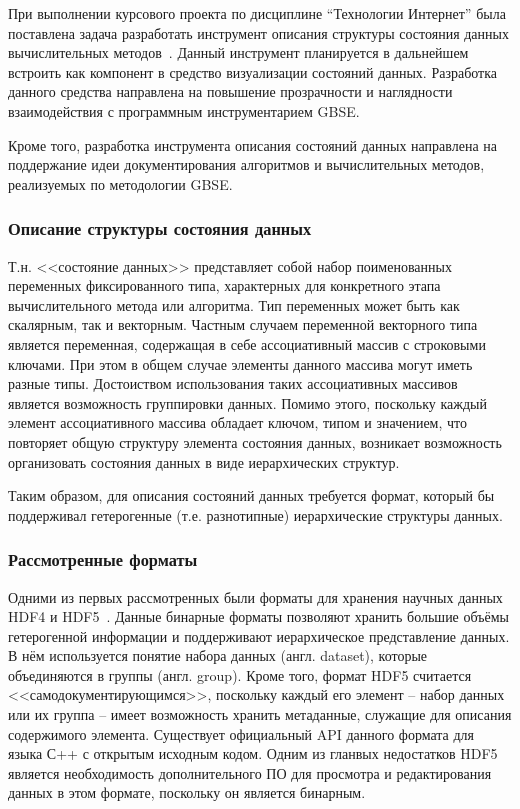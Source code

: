 \def\notedate{2022.05.17}
\def\currentauthor{Тришин И.В.}

При выполнении курсового проекта по дисциплине ``Технологии Интернет'' была поставлена задача разработать инструмент описания структуры состояния данных вычислительных методов~\cite{SokolovPershin2018}. Данный инструмент планируется в дальнейшем встроить как компонент в средство визуализации состояний данных. Разработка данного средства направлена на повышение прозрачности и наглядности взаимодействия с программным инструментарием GBSE.

Кроме того, разработка инструмента описания состояний данных направлена на поддержание идеи документирования алгоритмов и вычислительных методов, реализуемых по методологии GBSE.

\subsubsection{Описание структуры состояния данных}

Т.н. <<состояние данных>> представляет собой набор поименованных переменных фиксированного типа, характерных для конкретного этапа вычислительного метода или алгоритма. Тип переменных может быть как скалярным, так и векторным. Частным случаем переменной векторного типа является переменная, содержащая в себе ассоциативный массив с строковыми ключами. При этом в общем случае элементы данного массива могут иметь разные типы. Достоиством использования таких ассоциативных массивов является возможность группировки данных. Помимо этого, поскольку каждый элемент ассоциативного массива обладает ключом, типом и значением, что повторяет общую структуру элемента состояния данных, возникает возможность организовать состояния данных в виде иерархических структур.

Таким образом, для описания состояний данных требуется формат, который бы поддерживал гетерогенные (т.е. разнотипные) иерархические структуры данных.

\subsubsection{Рассмотренные форматы}

Одними из первых рассмотренных были форматы для хранения научных данных HDF4 и HDF5~\cite{HDFOffCite}. Данные бинарные форматы позволяют хранить большие объёмы гетерогенной информации и поддерживают иерархическое представление данных. В нём используется понятие набора данных (англ. dataset), которые объединяются в группы (англ. group). Кроме того, формат HDF5 считается <<самодокументирующимся>>, поскольку каждый его элемент -- набор данных или их группа -- имеет возможность хранить метаданные, служащие для описания содержимого элемента. Существует официальный API данного формата для языка С++ с открытым исходным кодом. Одним из гланвых недостатков HDF5 является необходимость дополнительного ПО для просмотра и редактирования данных в этом формате, поскольку он является бинарным.

